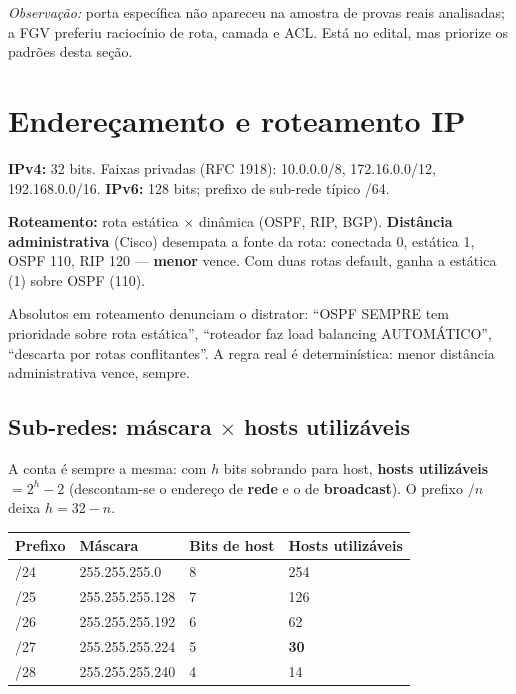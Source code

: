 \textit{Observação:} porta específica não apareceu na amostra de provas
reais analisadas; a FGV preferiu raciocínio de rota, camada e ACL. Está no
edital, mas priorize os padrões desta seção.

\section{Endereçamento e roteamento IP}

\textbf{IPv4:} 32 bits. Faixas privadas (RFC 1918): 10.0.0.0/8,
172.16.0.0/12, 192.168.0.0/16. \textbf{IPv6:} 128 bits; prefixo de sub-rede
típico /64.

\textbf{Roteamento:} rota estática $\times$ dinâmica (OSPF, RIP, BGP).
\textbf{Distância administrativa} (Cisco) desempata a fonte da rota:
conectada 0, estática 1, OSPF 110, RIP 120 --- \textbf{menor} vence. Com duas
rotas default, ganha a estática (1) sobre OSPF (110).

\begin{pegadinha}
Absolutos em roteamento denunciam o distrator: ``OSPF SEMPRE tem prioridade
sobre rota estática'', ``roteador faz load balancing AUTOMÁTICO'', ``descarta
por rotas conflitantes''. A regra real é determinística: menor distância
administrativa vence, sempre.
\end{pegadinha}

\subsection{Sub-redes: máscara $\times$ hosts utilizáveis}

A conta é sempre a mesma: com $h$ bits sobrando para host,
\textbf{hosts utilizáveis} $= 2^h - 2$ (descontam-se o endereço de
\textbf{rede} e o de \textbf{broadcast}). O prefixo $/n$ deixa $h = 32 - n$.

\begin{center}
\begin{tabular}{@{}p{1.6cm}p{3.6cm}p{2.2cm}p{3cm}@{}}
\toprule
\textbf{Prefixo} & \textbf{Máscara} & \textbf{Bits de host} & \textbf{Hosts utilizáveis} \\
\midrule
/24 & 255.255.255.0 & 8 & 254 \\
/25 & 255.255.255.128 & 7 & 126 \\
/26 & 255.255.255.192 & 6 & 62 \\
/27 & 255.255.255.224 & 5 & \textbf{30} \\
/28 & 255.255.255.240 & 4 & 14 \\
\bottomrule
\end{tabular}
\end{center}

